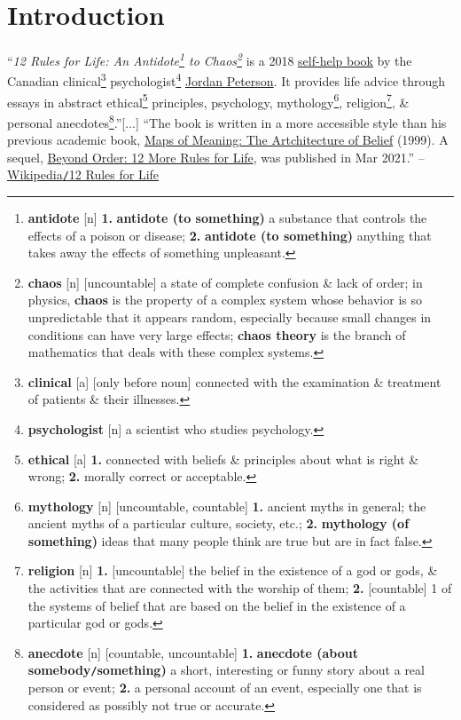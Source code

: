 \documentclass{article}
\begin{document}
\section*{Introduction}
``\textit{12 Rules for Life: An Antidote\footnote{\textbf{antidote} [n] \textbf{1.} \textbf{antidote (to something)} a substance that controls the effects of a poison or disease; \textbf{2.} \textbf{antidote (to something)} anything that takes away the effects of something unpleasant.} to Chaos\footnote{\textbf{chaos} [n] [uncountable] a state of complete confusion \& lack of order; in physics, \textbf{chaos} is the property of a complex system whose behavior is so unpredictable that it appears random, especially because small changes in conditions can have very large effects; \textbf{chaos theory} is the branch of mathematics that deals with these complex systems.}} is a 2018 \href{https://en.wikipedia.org/wiki/Self-help_book}{self-help book} by the Canadian clinical\footnote{\textbf{clinical} [a] [only before noun] connected with the examination \& treatment of patients \& their illnesses.} psychologist\footnote{\textbf{psychologist} [n] a scientist who studies psychology.} \href{https://en.wikipedia.org/wiki/Jordan_Peterson}{Jordan Peterson}. It provides life advice through essays in abstract ethical\footnote{\textbf{ethical} [a] \textbf{1.} connected with beliefs \& principles about what is right \& wrong; \textbf{2.} morally correct or acceptable.} principles, psychology, mythology\footnote{\textbf{mythology} [n] [uncountable, countable] \textbf{1.} ancient myths in general; the ancient myths of a particular culture, society, etc.; \textbf{2.} \textbf{mythology (of something)} ideas that many people think are true but are in fact false.}, religion\footnote{\textbf{religion} [n] \textbf{1.} [uncountable] the belief in the existence of a god or gods, \& the activities that are connected with the worship of them; \textbf{2.} [countable] 1 of the systems of belief that are based on the belief in the existence of a particular god or gods.}, \& personal anecdotes\footnote{\textbf{anecdote} [n] [countable, uncountable] \textbf{1.} \textbf{anecdote (about somebody{\tt/}something)} a short, interesting or funny story about a real person or event; \textbf{2.} a personal account of an event, especially one that is considered as possibly not true or accurate.}.''[$\ldots$] ``The book is written in a more accessible style than his previous academic book, \href{https://en.wikipedia.org/wiki/Maps_of_Meaning:_The_Architecture_of_Belief}{Maps of Meaning: The Artchitecture of Belief} (1999). A sequel, \href{https://en.wikipedia.org/wiki/Beyond_Order}{Beyond Order: 12 More Rules for Life}, was published in Mar 2021.'' -- \href{https://en.wikipedia.org/wiki/12_Rules_for_Life}{Wikipedia{\tt/}12 Rules for Life}
\end{document}
